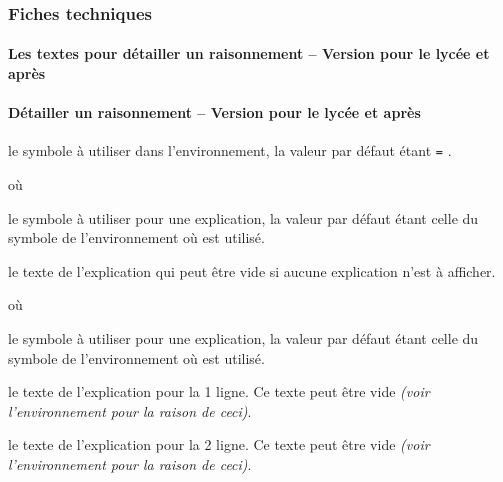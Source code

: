 \documentclass[12pt,a4paper]{article}
\begin{document}


\subsubsection{Fiches techniques}

\paragraph{Les textes pour détailler un raisonnement -- Version pour le lycée et après} \label{step-by-step-texts}







\paragraph{Détailler un raisonnement -- Version pour le lycée et après} \label{step-by-step-university} 


\IDoption{} le symbole à utiliser dans l'environnement, la valeur par défaut étant \verb+=+ .


\separation


 où \quad {}

\IDoption{} le symbole à utiliser pour une explication, la valeur par défaut étant celle du symbole de l'environnement  où  est utilisé.

\IDarg{} le texte de l'explication qui peut être vide si aucune explication n'est à afficher.


\separation


 où \quad {}

\IDoption{} le symbole à utiliser pour une explication, la valeur par défaut étant celle du symbole de l'environnement  où  est utilisé.

 le texte de l'explication pour la 1\iere{} ligne.
          Ce texte peut être vide \emph{(voir l'environnement  pour la raison de ceci)}.

 le texte de l'explication pour la 2\ieme{} ligne.
          Ce texte peut être vide \emph{(voir l'environnement  pour la raison de ceci)}.
\end{document}
